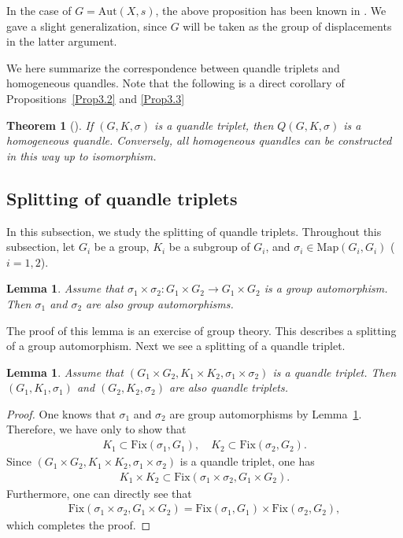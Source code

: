 \documentclass[12pt]{amsart}
\newtheorem{Thm}[Prop]{Theorem}
\newtheorem{Lem}[Prop]{Lemma}
\theoremstyle{definition}
\begin{document}
In the case of $ G = {\mathrm{Aut}}(X,s) $, the above proposition has been known in \cite{Joyce}. We gave a slight generalization, since $ G $ will be taken as the group of displacements in the latter argument.

We here summarize the correspondence between quandle triplets and homogeneous quandles. Note that the following is a direct corollary of Propositions~\ref{Prop3.2} and \ref{Prop3.3}

\begin{Thm}[\cite{Joyce}]\label{Thm3.4}
If $ (G,K,\sigma) $ is a quandle triplet, then $ Q(G,K,\sigma) $ is a homogeneous quandle. Conversely, all homogeneous quandles can be constructed in this way up to isomorphism.
\end{Thm}

\subsection{Splitting of quandle triplets}

In this subsection, we study the splitting of quandle triplets. Throughout this subsection, let $ G_{i} $ be a group, $ K_{i} $ be a subgroup of $ G_{i} $, and $ \sigma_{i} \in {\mathrm{Map}}(G_{i},G_{i}) $ ($ i =1,2 $).

\begin{Lem}\label{Lem3.5}
Assume that $ \sigma_{1} \times \sigma_{2} : G_{1} \times G_{2} \rightarrow G_{1} \times G_{2} $ is a group automorphism. Then $ \sigma_{1} $ and $ \sigma_{2} $ are also group automorphisms.
\end{Lem}

The proof of this lemma is an exercise of group theory. This describes a splitting of a group automorphism. Next we see a splitting of a quandle triplet.

\begin{Lem}\label{Lem3.6}
Assume that $ (G_{1} \times G_{2}, K_{1} \times K_{2}, \sigma_{1} \times \sigma_{2}) $ is a quandle triplet. Then $ (G_{1},K_{1},\sigma_{1}) $ and $ (G_{2},K_{2},\sigma_{2}) $ are also quandle triplets.
\end{Lem}

\begin{proof}
One knows that $ \sigma_{1} $ and $ \sigma_{2} $ are group automorphisms by Lemma~\ref{Lem3.5}. Therefore, we have only to show that
\begin{align*}
K_{1} \subset {\mathrm{Fix}}(\sigma_{1}, G_{1}), \quad K_{2} \subset {\mathrm{Fix}}(\sigma_{2}, G_{2}).
\end{align*}
Since $ (G_{1} \times G_{2}, K_{1} \times K_{2}, \sigma_{1} \times \sigma_{2}) $ is a quandle triplet, one has
\begin{align*}
K_{1} \times K_{2} \subset {\mathrm{Fix}}(\sigma_{1} \times \sigma_{2},G_{1} \times G_{2}).
\end{align*}
Furthermore, one can directly see that 
\begin{align*}
{\mathrm{Fix}}(\sigma_{1} \times \sigma_{2},G_{1} \times G_{2}) = {\mathrm{Fix}}(\sigma_{1},G_{1}) \times {\mathrm{Fix}}(\sigma_{2},G_{2}),
\end{align*}
which completes the proof.
\end{proof}
\end{document}
